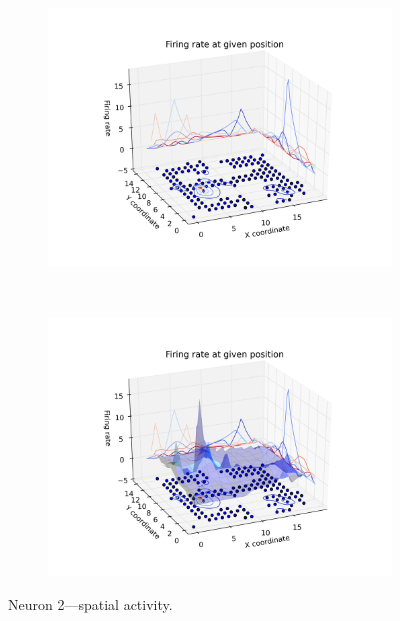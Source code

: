 \documentclass[11pt,a4paper,twocolumn]{article}
\begin{document}
\begin{figure}[h]
  \begin{subfigure}{.99\linewidth}\centering
    \includegraphics[width=1.1\textwidth]{figure7_a.png}
    \caption{\label{fig:3d_n2_a}}
  \end{subfigure}\\[1ex]
  \begin{subfigure}{.99\linewidth}\centering
    \includegraphics[width=1.1\textwidth]{figure7_b.png}
    \caption{\label{fig:3d_n2_b}}
  \end{subfigure}

  \caption{Neuron 2---spatial activity.\label{fig:3d_n2}}
\end{figure}
\end{document}
